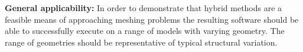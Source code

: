 \noindent
\textbf{General applicability:} In order to demonstrate that hybrid methods are a feasible means of approaching meshing problems the resulting software should be able to successfully execute on a range of models with varying geometry. The range of geometries should be representative of typical structural variation.